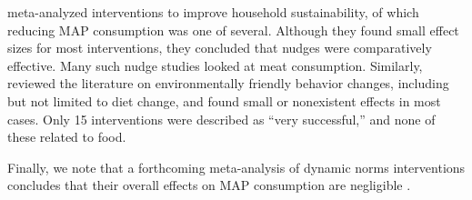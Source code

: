 \documentclass[sn-nature,pdflatex]{sn-jnl}
\begin{document}
\citep{nisa2019} meta-analyzed interventions to improve household
sustainability, of which reducing MAP consumption was one of several.
Although they found small effect sizes for most interventions, they
concluded that nudges were comparatively effective. Many such nudge
studies looked at meat consumption. Similarly, \citep{rau2022} reviewed
the literature on environmentally friendly behavior changes, including
but not limited to diet change, and found small or nonexistent effects
in most cases. Only 15 interventions were described as ``very
successful,'' and none of these related to food.

Finally, we note that a forthcoming meta-analysis of dynamic norms
interventions concludes that their overall effects on MAP consumption
are negligible \citep{Weikertova2024}.

\newpage

\renewcommand\refname{References}

\end{document}

